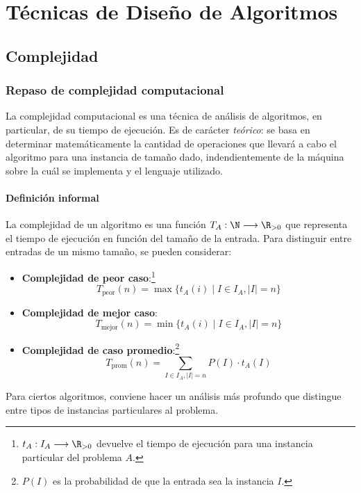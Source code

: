 \chapter{Técnicas de Diseño de Algoritmos}

\section{Complejidad}

\subsection{Repaso de complejidad computacional}

La complejidad computacional es una técnica de análisis de algoritmos, en particular, de su tiempo de ejecución. Es de carácter \textit{teórico}: se basa en determinar matemáticamente la cantidad de operaciones que llevará a cabo el algoritmo para una instancia de tamaño dado, indendientemente de la máquina sobre la cuál se implementa y el lenguaje utilizado.

\subsubsection{Definición informal}

La complejidad de un algoritmo es una función $T_A: \N \longrightarrow \R_{>0}$ que representa el tiempo de ejecución en función del tamaño de la entrada. Para distinguir entre entradas de un mismo tamaño, se pueden considerar:
\begin{itemize}
    \item \textbf{Complejidad de peor caso}:\footnote{$t_A: I_A \longrightarrow \R_{>0}$ devuelve el tiempo de ejecución para una instancia particular del problema $A$.}
          $$T_{\text{peor}}(n) = \max{\{t_A(i)} \mid I \in I_A, |I| = n\}$$
    \item \textbf{Complejidad de mejor caso}:
          $$T_{\text{mejor}}(n) = \min{\{t_A(i)} \mid I \in I_A, |I| = n\}$$
    \item \textbf{Complejidad de caso promedio}:\footnote{$P(I)$ es la probabilidad de que la entrada sea la instancia $I$.}
          $$T_{\text{prom}}(n) = \sum_{I \in I_A, |I| = n} P(I) \cdot t_A(I) $$
\end{itemize}

Para ciertos algoritmos, conviene hacer un análisis más profundo que distingue entre tipos de instancias particulares al problema.

